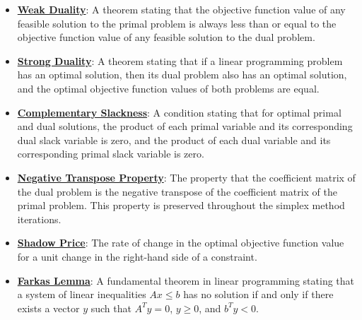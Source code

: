 \documentclass{article}%
\begin{document}
\begin{itemize}[leftmargin=*]
\item \href{https://www.math.purdue.edu/~yipn/421/2024-09-12-Duality.pdf#page=2}{\textbf{Weak Duality}}: A theorem stating that the objective function value of any feasible solution to the primal problem is always less than or equal to the objective function value of any feasible solution to the dual problem.%
\item \href{https://www.math.purdue.edu/~yipn/421/2024-09-12-Duality.pdf#page=11}{\textbf{Strong Duality}}: A theorem stating that if a linear programming problem has an optimal solution, then its dual problem also has an optimal solution, and the optimal objective function values of both problems are equal.%
\item \href{https://www.math.purdue.edu/~yipn/421/2024-09-12-Duality.pdf#page=5}{\textbf{Complementary Slackness}}: A condition stating that for optimal primal and dual solutions, the product of each primal variable and its corresponding dual slack variable is zero, and the product of each dual variable and its corresponding primal slack variable is zero.%
\item \href{https://www.math.purdue.edu/~yipn/421/2024-09-12-Duality.pdf#page=6}{\textbf{Negative Transpose Property}}: The property that the coefficient matrix of the dual problem is the negative transpose of the coefficient matrix of the primal problem. This property is preserved throughout the simplex method iterations.%
\item \href{https://www.math.purdue.edu/~yipn/421/2024-10-01-SensitivityDuality.pdf#page=10}{\textbf{Shadow Price}}: The rate of change in the optimal objective function value for a unit change in the right-hand side of a constraint.%
\item \href{https://www.math.purdue.edu/~yipn/421/2024-10-28-Farkas.pdf#page=1}{\textbf{Farkas Lemma}}: A fundamental theorem in linear programming stating that a system of linear inequalities $Ax \le b$ has no solution if and only if there exists a vector $y$ such that $A^T y = 0$, $y \ge 0$, and $b^T y < 0$.%
\end{itemize}

%
\end{document}
